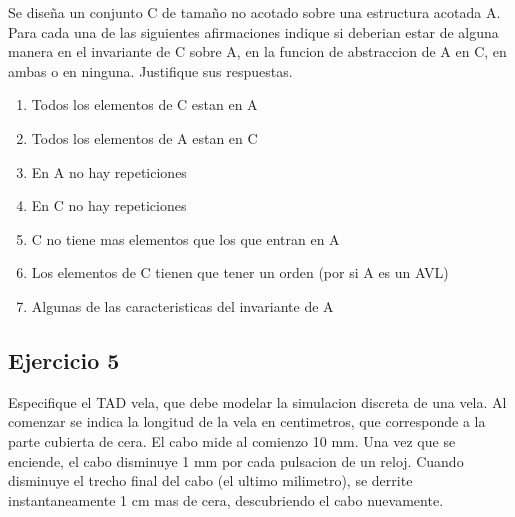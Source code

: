 \documentclass[10pt, a4paper]{article}
\begin{document}
Se dise\~na un conjunto C de tama\~no no acotado sobre una estructura acotada A. Para cada una de las siguientes afirmaciones indique si deberian estar de alguna manera en el invariante de C sobre A, en la funcion de abstraccion de A en C, en ambas o en ninguna. Justifique sus respuestas.

\begin{enumerate}
 \item Todos los elementos de C estan en A
 \item Todos los elementos de A estan en C
 \item En A no hay repeticiones
 \item En C no hay repeticiones
 \item C no tiene mas elementos que los que entran en A
 \item Los elementos de C tienen que tener un orden (por si A es un AVL)
 \item Algunas de las caracteristicas del invariante de A
\end{enumerate}

\subsection*{Ejercicio 5}

Especifique el TAD vela, que debe modelar la simulacion discreta de una vela. Al comenzar se indica la longitud de la vela en centimetros, que corresponde a la parte cubierta de cera. El cabo mide al comienzo 10 mm. Una vez que se enciende, el cabo disminuye 1 mm por cada pulsacion de un reloj. Cuando disminuye el trecho final del cabo (el ultimo milimetro), se derrite instantaneamente 1 cm mas de cera, descubriendo el cabo nuevamente.
\end{document}
